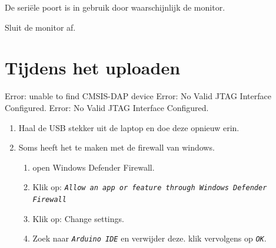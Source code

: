 De seriële poort is in gebruik door waarschijnlijk de monitor.

Sluit de monitor af.
 
 
\section{Tijdens het uploaden}
 Error: unable to find CMSIS-DAP device
 Error: No Valid JTAG Interface Configured.
 Error: No Valid JTAG Interface Configured.
 \begin{enumerate}
 	\item 
 Haal de USB stekker uit de laptop en doe deze opnieuw erin.
  \item Soms heeft het te maken met de firewall van windows.
  \begin{enumerate}
  	\item open Windows Defender Firewall.
  	\item Klik op: \texttt{\textit{Allow an app or feature through Windows Defender Firewall}}
   \item Klik op: Change settings.  	
   \item Zoek  naar \texttt{\textit{Arduino IDE}} en verwijder deze.  klik vervolgens op \texttt{\textit{OK}}.
   

\end{enumerate}
\end{enumerate}
